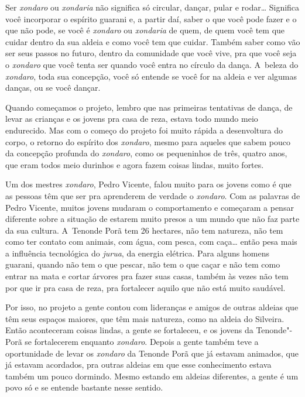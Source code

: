 Ser \emph{xondaro} ou \emph{xondaria} não significa só circular, dançar, pular e
rodar\ldots{} Significa você incorporar o espírito guarani e, a partir daí,
saber o que você pode fazer e o que não pode, se você é \emph{xondaro} ou
\emph{xondaria} de quem, de quem você tem que cuidar dentro da sua aldeia e
como você tem que cuidar. Também saber como vão ser seus passos no
futuro, dentro da comunidade que você vive, pra que você seja o \emph{xondaro}
que você tenta ser quando você entra no círculo da dança. A~beleza do
\emph{xondaro}, toda sua concepção, você só entende se você for na aldeia e
ver algumas danças, ou se você dançar.

Quando começamos o projeto, lembro que nas primeiras tentativas de
dança, de levar as crianças e os jovens pra casa de reza, estava todo
mundo meio endurecido. Mas com o começo do projeto foi muito rápida a
desenvoltura do corpo, o retorno do espírito dos \emph{xondaro}, mesmo para
aqueles que sabem pouco da concepção profunda do \emph{xondaro}, como os
pequeninhos de três, quatro anos, que eram todos meio durinhos e agora
fazem coisas lindas, muito fortes. 

Um dos mestres \emph{xondaro}, Pedro Vicente, falou muito para os jovens como é
que as pessoas têm que ser pra aprenderem de verdade o \emph{xondaro}. Com as
palavras de Pedro Vicente, muitos jovens mudaram o comportamento e
começaram a pensar diferente sobre a situação de estarem muito presos a
um mundo que não faz parte da sua cultura. A~Tenonde Porã tem 26
hectares, não tem natureza, não tem como ter contato com animais, com
água, com pesca, com caça\ldots{} então pesa mais a influência tecnológica
do \emph{jurua}, da energia elétrica. Para alguns homens guarani, quando não
tem o que pescar, não tem o que caçar e não tem como entrar na mata e
cortar árvores pra fazer suas casas, também às vezes não tem por que ir
pra casa de reza, pra fortalecer aquilo que não está muito saudável.

Por isso, no projeto a gente contou com lideranças e amigos de outras
aldeias que têm seus espaços maiores, que têm mais natureza, como na
aldeia do Silveira. Então aconteceram coisas lindas, a gente se
fortaleceu, e os jovens da Tenonde"-Porã se fortalecerem enquanto
\emph{xondaro}. Depois a gente também teve a oportunidade de levar os \emph{xondaro}
da Tenonde Porã que já estavam animados, que já estavam acordados, pra
outras aldeias em que esse conhecimento estava também um pouco
dormindo. Mesmo estando em aldeias diferentes, a gente é um povo só e
se entende bastante nesse sentido.

